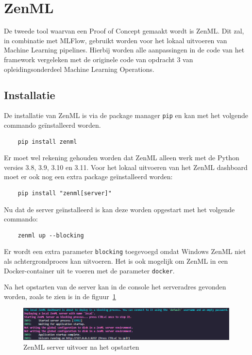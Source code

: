 \section{ZenML}
De tweede tool waarvan een Proof of Concept gemaakt wordt is ZenML. Dit zal, in combinatie met MLFlow, gebruikt worden voor het lokaal uitvoeren van Machine Learning pipelines. Hierbij worden alle aanpassingen in de code van het framework vergeleken met de originele code van opdracht 3 van opleidingsonderdeel Machine Learning Operations.

\subsection{Installatie}
De installatie van ZenML is via de package manager \texttt{pip} en kan met het volgende commando geïnstalleerd worden.
\begin{verbatim}
    pip install zenml
\end{verbatim}
Er moet wel rekening gehouden worden dat ZenML alleen werk met de Python versies 3.8, 3.9, 3.10 en 3.11.
Voor het lokaal uitvoeren van het ZenML dashboard moet er ook nog een extra package geïnstalleerd worden:
\begin{verbatim}
    pip install "zenml[server]"
\end{verbatim}

Nu dat de server geïnstalleerd is kan deze worden opgestart met het volgende commando: 
\begin{verbatim}
    zenml up --blocking
\end{verbatim}
Er wordt een extra parameter \texttt{blocking} toegevoegd omdat Windows ZenML niet als achtergrondproces kan uitvoeren. Het is ook mogelijk om ZenML in een Docker-container uit te voeren met de parameter \texttt{docker}.

Na het opstarten van de server kan in de console het serveradres gevonden worden, zoals te zien is in de figuur~\ref{fig:ZenMLServer}
\begin{figure}[h]
    \centering
    \includegraphics[width=0.9\linewidth]{graphics/ZenML_Server.PNG}
    \caption{ZenML server uitvoer na het opstarten}
    \label{fig:ZenMLServer}
\end{figure}
